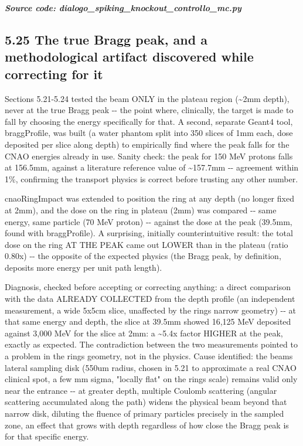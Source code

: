\documentclass[
  english,
]{article}
\begin{document}
\textit{\textbf{Source code: dialogo\_\allowbreak{}spiking\_\allowbreak{}knockout\_\allowbreak{}controllo\_\allowbreak{}mc.py}}


\subsection{5.25 The true Bragg peak, and a methodological artifact discovered while correcting for it}\label{the-true-bragg-peak-and-a-methodological-artifact-discovered-while-correcting-for-it}

Sections 5.21-5.24 tested the beam ONLY in the plateau region (\textasciitilde2mm depth), never at the true Bragg peak -\/- the point where, clinically, the target is made to fall by choosing the energy specifically for that. A second, separate Geant4 tool, braggProfile, was built (a water phantom split into 350 slices of 1mm each, dose deposited per slice along depth) to empirically find where the peak falls for the CNAO energies already in use. Sanity check: the peak for 150 MeV protons falls at 156.5mm, against a literature reference value of \textasciitilde157.7mm -\/- agreement within 1\%, confirming the transport physics is correct before trusting any other number.

cnaoRingImpact was extended to position the ring at any depth (no longer fixed at 2mm), and the dose on the ring in plateau (2mm) was compared -\/- same energy, same particle (70 MeV proton) -\/- against the dose at the peak (39.5mm, found with braggProfile). A surprising, initially counterintuitive result: the total dose on the ring AT THE PEAK came out LOWER than in the plateau (ratio 0.80x) -\/- the opposite of the expected physics (the Bragg peak, by definition, deposits more energy per unit path length).

Diagnosis, checked before accepting or correcting anything: a direct comparison with the data ALREADY COLLECTED from the depth profile (an independent measurement, a wide 5x5cm slice, unaffected by the ring\textquotesingle s narrow geometry) -\/- at that same energy and depth, the slice at 39.5mm showed 16,125 MeV deposited against 3,000 MeV for the slice at 2mm: a \textasciitilde5.4x factor HIGHER at the peak, exactly as expected. The contradiction between the two measurements pointed to a problem in the ring\textquotesingle s geometry, not in the physics. Cause identified: the beam\textquotesingle s lateral sampling disk (550um radius, chosen in 5.21 to approximate a real CNAO clinical spot, a few mm sigma, "locally flat" on the ring\textquotesingle s scale) remains valid only near the entrance -\/- at greater depth, multiple Coulomb scattering (angular scattering accumulated along the path) widens the physical beam beyond that narrow disk, diluting the fluence of primary particles precisely in the sampled zone, an effect that grows with depth regardless of how close the Bragg peak is for that specific energy.
\end{document}
